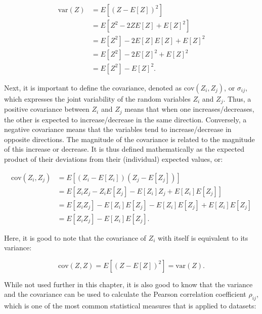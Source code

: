 \begin{align}
\mathrm{var}(Z) &= E\left[{\left(Z-E\left[Z\right]\right)}^2\right] \label{eq:variance1} \\
&= E\left[Z^2 -2ZE\left[Z\right] + E[Z]^2\right] \nonumber \\
&= E\left[Z^2\right] - 2E\left[Z\right]E\left[Z\right] + E\left[Z\right]^2 \nonumber \\
&= E\left[Z^2\right] - 2E\left[Z\right]^2 + E\left[Z\right]^2 \nonumber \\
&= E\left[Z^2\right]-{E[Z]}^2. \label{eq:variance2}
\end{align}

Next, it is important to define the covariance, denoted as \(\mathrm{cov}(Z_i,Z_j)\), or \(\sigma_{ij}\), which expresses the joint variability of the random variables \(Z_i\) and \(Z_j\).
Thus, a positive covariance between \(Z_i\) and \(Z_j\) means that when one increases/decreases, the other is expected to increase/decrease in the same direction.
Conversely, a negative covariance means that the variables tend to increase/decrease in opposite directions.
The magnitude of the covariance is related to the magnitude of this increase or decrease.
It is thus defined mathematically as the expected product of their deviations from their (individual) expected values, or:

\begin{align}
\mathrm{cov}(Z_i, Z_j) &= E\left[\left(Z_i-E[Z_i]\right) \left(Z_j-E[Z_j]\right)\right] \label{eq:covariance} \\
&= E\left[Z_iZ_j - Z_iE\left[Z_j\right] - E\left[Z_i\right]Z_j + E\left[Z_i\right]E\left[Z_j\right]\right] \nonumber \\
&= E\left[Z_iZ_j\right] - E\left[Z_i\right]E\left[Z_j\right] - E\left[Z_i\right]E\left[Z_j\right] + E\left[Z_i\right]E\left[Z_j\right] \nonumber \\
&= E\left[Z_iZ_j\right] - E\left[Z_i\right]E\left[Z_j\right]. \label{eq:covariance2}
\end{align}

Here, it is good to note that the covariance of \(Z_i\) with itself is equivalent to its variance:

\begin{equation}
\mathrm{cov}(Z,Z) = E\left[\left(Z-E[Z]\right)^2\right] = \mathrm{var}(Z). \nonumber
\end{equation}

While not used further in this chapter, it is also good to know that the variance and the covariance can be used to calculate the Pearson correlation coefficient \(\rho_{ij}\), which is one of the most common statistical measures that is applied to datasets:


